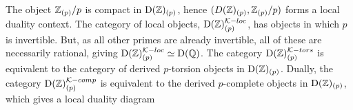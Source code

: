 \begin{example}
    The object $\mathbb{Z}_{(p)}/p$ is compact in $\mathrm{D}(\mathbb{Z})_{(p)}$, hence $(D(\mathbb{Z})_{(p)}, \mathbb{Z}_{(p)}/p)$ forms a local duality context. The category of local objects, $\mathrm{D}(\mathbb{Z})_{(p)}^{\mathcal{K}-loc}$, has objects in which $p$ is invertible. But, as all other primes are already invertible, all of these are necessarily rational, giving $\mathrm{D}(\mathbb{Z})_{(p)}^{\mathcal{K}-loc} \simeq \mathrm{D}(\mathbb{Q})$. The category $\mathrm{D}(\mathbb{Z})_{(p)}^{\mathcal{K}-tors}$ is equivalent to the category of derived $p$-torsion objects in $\mathrm{D}(\mathbb{Z})_{(p)}$. Dually, the category $\mathrm{D}(\mathbb{Z})_{(p)}^{\mathcal{K}-comp}$ is equivalent to the derived $p$-complete objects in $\mathrm{D}(\mathbb{Z})_{(p)}$, which gives a local duality diagram 
    \begin{center}
    \end{center}
\end{example}






































































